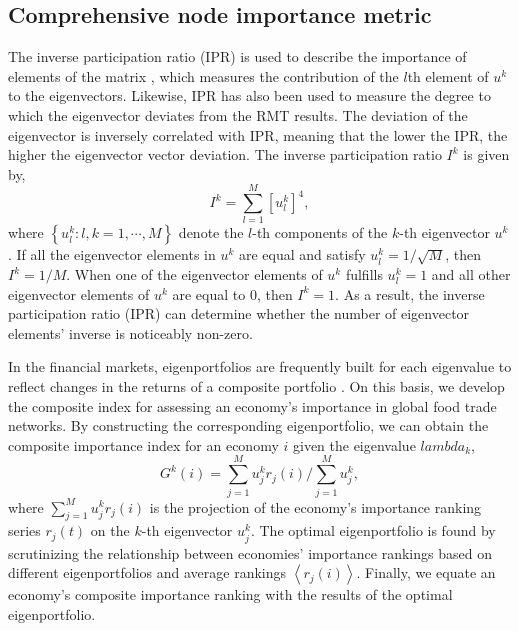 \documentclass[preprint,3p,times,sort&compress]{elsarticle}
\begin{document}
\subsection{Comprehensive node importance metric}


The inverse participation ratio (IPR) is used to describe the importance of elements of the matrix \cite{Fyodorov-Mirlin-1992-PhysRevLett,Plerou-Gopikrishnan-Rosenow-Amaral-Stanley-1999-PhysRevLett}, which measures the contribution of the $l$th element of $u^{k}$ to the eigenvectors. Likewise, IPR has also been used to measure the degree to which the eigenvector deviates from the RMT results. The deviation of the eigenvector is inversely correlated with IPR, meaning that the lower the IPR, the higher the eigenvector vector deviation. The inverse participation ratio $I^{k}$ is given by,
\begin{equation}
   I^{k}=\sum_{l=1}^{M}\left[u_{l}^{k}\right]^{4},
   \label{Eq:RMT:IPR}
\end{equation}
where $\left\{u_{l}^{k}: l, k=1, \cdots, M\right\}$ denote the $l$-th components of the $k$-th eigenvector $u^{k}$. If all the eigenvector elements in $u^{k}$ are equal and satisfy $u^k_l=1/\sqrt{M}$, then $I^{k}=1/M$. When one of the eigenvector elements of $u^{k}$ fulfills $u^k_l=1$ and all other eigenvector elements of $u^{k}$ are equal to 0, then $I^{k}=1$. As a result, the inverse participation ratio (IPR) can determine whether the number of eigenvector elements' inverse is noticeably non-zero. 



In the financial markets, eigenportfolios are frequently built for each eigenvalue to reflect changes in the returns of a composite portfolio \cite{Dai-Huynh-Zheng-Zhou-2022-ResIntBusFinanc}. On this basis, we develop the composite index for assessing an economy's importance in global food trade networks. By constructing the corresponding eigenportfolio, we can obtain the composite importance index for an economy $i$ given the eigenvalue $lambda_k$,
\begin{equation}
G^{k}(i)=\sum_{j=1}^{M} u_{j}^{k} r_{j}(i) / \sum_{j=1}^{M} u_{j}^{k},
\end{equation}
where $\sum_{j=1}^{M} u_{j}^{k} r_{j}(i)$ is the projection of the economy's importance ranking series $r_{j}(t)$ on the $k$-th eigenvector $u_{j}^{k}$. The optimal eigenportfolio is found by scrutinizing the relationship between economies' importance rankings based on different eigenportfolios and average rankings $\left\langle r_{j}(i) \right\rangle$. Finally, we equate an economy's composite importance ranking with the results of the optimal eigenportfolio.
\end{document}
